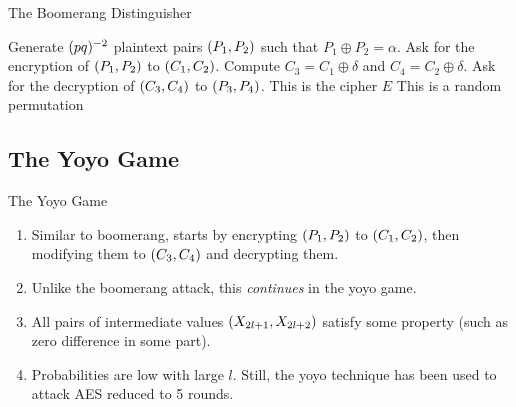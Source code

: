 \documentclass[notheorems]{beamer}
\theoremstyle{definition}
\theoremstyle{example}
\begin{document}
    \begin{frame}{The Boomerang Distinguisher}
        \begin{algorithm}[H]
            \caption{The Boomerang Attack Distinguisher}
            \label{alg:boomerang-dist}
            \algrenewcommand{}
            \small
            \begin{algorithmic}[1]
                \State Generate \((pq)^{-2}\) plaintext pairs \((P_1, P_2)\)
                such that \(P_1 \oplus P_2 = \alpha\).
                    \State Ask for the encryption of \((P_1, P_2)\) to \((C_1,
                    C_2)\).
                    \State Compute \(C_3 = C_1 \oplus \delta\) and \(C_4 = C_2 \oplus 
                    \delta\). 
                    \State Ask for the decryption of \((C_3, C_4)\) to \((P_3,
                    P_4)\).
                        \State \Return This is the cipher \(E\)
                    \EndIf
                \EndFor
                \State \Return This is a random permutation
            \end{algorithmic}
        \end{algorithm}
    \end{frame}

    \subsection{The Yoyo Game}
    \label{subsec:yoyo-game}
    
    \begin{frame}[<+->]{The Yoyo Game}
        \begin{enumerate}
            \item Similar to boomerang, starts by encrypting \((P_1, P_2)\)
            to \((C_1, C_2)\), then modifying them to \((C_3, C_4)\)
            and decrypting them.
            \item Unlike the boomerang attack, this \emph{continues} in the yoyo
            game.
            \item All pairs of intermediate values \((X_{2l + 1}, X_{2l +
            2})\) satisfy some property (such as zero difference in some part).
            \item Probabilities are low with large \(l\). Still, the yoyo
            technique has been used to attack AES reduced to 5 rounds.
        \end{enumerate}
    \end{frame}
\end{document}
